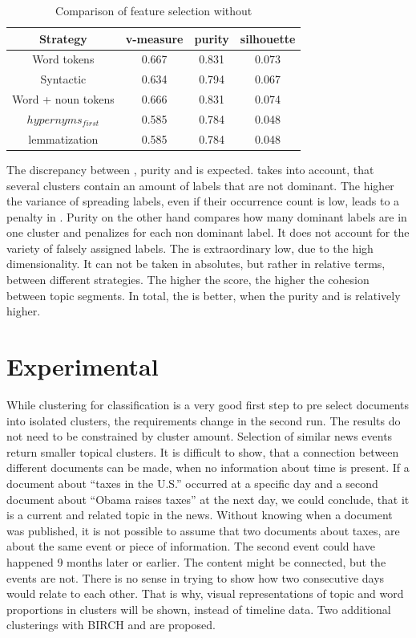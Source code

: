  \begin{table}[h!]\label{comparison_single_without_lsa}
    \centering
    \begin{tabular}{ c | c | c | c }
      Strategy    & v-measure & purity  & silhouette \\ \hline
      Word tokens & 0.667     & 0.831   & 0.073      \\
      Syntactic   & 0.634     & 0.794     & 0.067 \\
      Word + noun tokens & 0.666   & 0.831     & 0.074 \\
      \wordnet{} $hypernyms_{first}$ & 0.585   & 0.784     & 0.048 \\
      \wordnet{} lemmatization   & 0.585   & 0.784     & 0.048 \\
    \end{tabular}
    \caption{Comparison of feature selection without \lsa{}}
  \end{table}

The discrepancy between \vmeasure{}, purity and \silco{} is expected. \vmeasure{} takes into account, that several clusters contain an amount of labels that are not dominant. The higher the variance of spreading labels, even if their occurrence count is low, leads to a penalty in \vmeasure{}. Purity on the other hand compares how many dominant labels are in one cluster and penalizes for each non dominant label. It does not account for the variety of falsely assigned labels. The \silco{} is extraordinary low, due to the high dimensionality. It can not be taken in absolutes, but rather in relative terms, between different strategies. The higher the score, the higher the cohesion between topic segments. In total, the \silco{} is better, when the purity and \vmeasure{} is relatively higher.

\section{Experimental}
While clustering for classification is a very good first step to pre select documents into isolated clusters, the requirements change in the second run. The results do not need to be constrained by cluster amount. Selection of similar news events return smaller topical clusters. It is difficult to show, that a connection between different documents can be made, when no information about time is present. If a document about ``taxes in the U.S.'' occurred at a specific day and a second document about ``Obama raises taxes'' at the next day, we could conclude, that it is a current and related topic in the news. Without knowing when a document was published, it is not possible to assume that two documents about taxes, are about the same event or piece of information. The second event could have happened 9 months later or earlier. The content might be connected, but the events are not. There is no sense in trying to show how two consecutive days would relate to each other. That is why, visual representations of topic and word proportions in clusters will be shown, instead of timeline data. Two additional clusterings with BIRCH and \lda{} are proposed.\\

